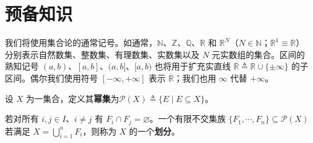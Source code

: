 \documentclass[../../main.tex]{subfiles}%
\begin{document}
\section{预备知识}\label{section:ch01-预备知识}

我们将使用集合论的通常记号。如通常，$\mathbb{N}$、$\mathbb{Z}$、$\mathbb{Q}$、$\mathbb{R}$ 和 $\mathbb{R}^N$（$N\in\mathbb{N}$；$\mathbb{R}^1\equiv\mathbb{R}$）分别表示自然数集、整数集、有理数集、实数集以及 $N$ 元实数组的集合。区间的熟知记号 $(a,b)$、$[a,b]$、$(a,b]$、$[a,b)$ 也将用于扩充实直线 $\overline{\mathbb{R}}\triangleq \mathbb{R}\cup\{\pm\infty\}$ 的子区间。偶尔我们使用符号 $[-\infty,+\infty]$ 表示 $\overline{\mathbb{R}}$；我们也用 $\infty$ 代替 $+\infty$。

\begin{definition}
设 $X$ 为一集合，定义其\textbf{幂集}为$\mathcal{P}(X)\triangleq \{E\mid E\subseteq X\}$。

若对所有 $i,j\in I$、$i\neq j$ 有 $F_i\cap F_j=\varnothing $。一个有限不交集族 $\{F_1,\cdots,F_n\}\subseteq\mathcal{P}(X)$ 若满足 $X=\bigcup_{i=1}^n F_i$，则称为 $X$ 的一个\textbf{划分}。
\end{definition}
\end{document}
